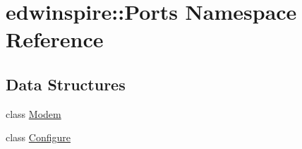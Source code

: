 \hypertarget{namespaceedwinspire_1_1_ports}{\section{edwinspire\-:\-:Ports Namespace Reference}
\label{namespaceedwinspire_1_1_ports}
}
\subsection*{Data Structures}
\begin{DoxyCompactItemize}
\item 
class \hyperlink{classedwinspire_1_1_ports_1_1_modem}{Modem}
\item 
class \hyperlink{classedwinspire_1_1_ports_1_1_configure}{Configure}
\end{DoxyCompactItemize}

